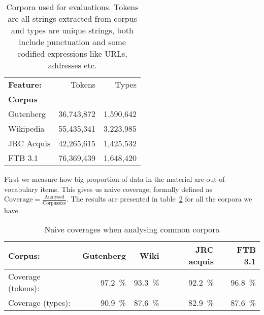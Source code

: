 \documentclass[preprint]{flammie}
\begin{document}
\begin{table}
    \begin{scriptsize}
  \centering
    \begin{tabular}{|l|r|r|}
        \hline
        \bf Feature: & Tokens     & Types     \\
        \bf Corpus   &            &           \\
        \hline
        Gutenberg    & 36,743,872 & 1,590,642 \\
        Wikipedia    & 55,435,341 & 3,223,985 \\
        JRC Acquis   & 42,265,615 & 1,425,532 \\
        FTB 3.1      & 76,369,439 & 1,648,420 \\
        \hline
    \end{tabular}
  \caption{Corpora used for evaluations. Tokens are all strings extracted from
      corpus and types are unique strings, both include punctuation and some
      codified expressions like URLs, addresses etc.
  \label{table:corpora}}
  \end{scriptsize}
\end{table}

First we measure how big proportion of data in the material are
out-of-vocabulary items. This gives us naive coverage, formally defined as
$\mathrm{Coverage} = \frac{\mathrm{Analysed}}{\mathrm{Corpus size}}$.
The results are presented in table~\ref{table:coverage} for all the
corpora we have.

\begin{table}
    \begin{scriptsize}
    \centering
    \begin{tabular}{|l|r|r|r|r|}
        \hline
        Corpus:            & \bf Gutenberg & \bf Wiki & \bf JRC acquis & \bf FTB 3.1 \\
        \hline
        Coverage (tokens): & 97.2~\%       & 93.3~\%  & 92.2~\%        & 96.8~\% \\
        Coverage (types):  & 90.9~\%       & 87.6~\%  & 82.9~\%        & 87.6~\% \\
        \hline
    \end{tabular}
    \caption{Naive coverages when analysing common corpora
    \label{table:coverage}}
  \end{scriptsize}
\end{table}

\end{document}

